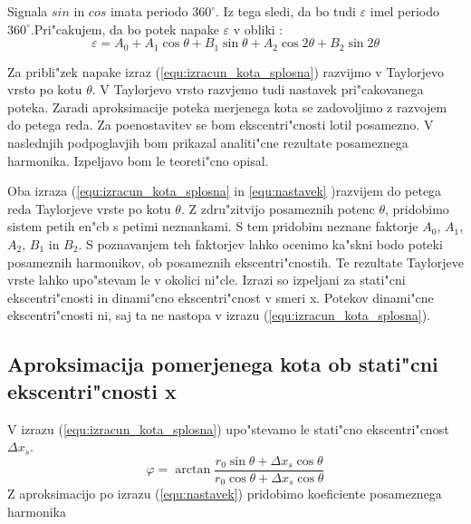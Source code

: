 Signala $sin$ in $cos$ imata periodo $360^\circ$. Iz tega sledi, da bo tudi $\varepsilon$ imel periodo $360^\circ $.Pri"cakujem, da bo potek napake $\varepsilon$ v obliki :
\begin{equation}
\label{equ:nastavek}
\varepsilon=A_0+A_1 \cos \theta +B_1 \sin \theta+A_2 \cos 2\theta +B_2 \sin 2\theta
\end{equation}

Za pribli"zek napake izraz  (\ref{equ:izracun_kota_splosna}) razvijmo v Taylorjevo vrsto po kotu $\theta$. V Taylorjevo vrsto razvjemo tudi nastavek pri"cakovanega poteka. Zaradi aproksimacije poteka merjenega kota se zadovoljimo z razvojem do petega reda. Za poenostavitev se bom ekscentri"cnosti lotil posamezno. V naslednjih podpoglavjih bom prikazal analiti"cne rezultate posameznega harmonika. Izpeljavo bom le teoreti"cno opisal.

Oba izraza (\ref{equ:izracun_kota_splosna} in \ref{equ:nastavek} )razvijem do petega reda Taylorjeve vrste  po kotu $\theta$. Z zdru"zitvijo posameznih potenc $\theta$, pridobimo sistem petih en"cb s petimi neznankami. S tem pridobim neznane faktorje $A_0$, $A_1$, $A_2$, $B_1$ in $B_2$. S poznavanjem teh faktorjev lahko ocenimo ka"skni bodo poteki posameznih harmonikov, ob posameznih ekscentri"cnostih. Te rezultate Taylorjeve vrste lahko upo"stevam le v okolici ni"cle. Izrazi so izpeljani za stati"cni ekscentri"cnosti in dinami"cno ekscentri"cnost v smeri x. Potekov dinami"cne ekscentri"cnosti ni, saj ta ne nastopa v izrazu (\ref{equ:izracun_kota_splosna}).
\subsection{Aproksimacija pomerjenega kota ob stati"cni ekscentri"cnosti x}
V izrazu (\ref{equ:izracun_kota_splosna}) upo"stevamo le stati"cno ekscentri"cnost $\Delta x_s$.
\begin{equation}
\label{equ:izracun_kota_xs}
\varphi=\arctan \frac{r_0 \sin\theta +\Delta x_s \cos\theta}{r_0 \cos\theta +\Delta x_s \cos\theta}
\end{equation}
Z aproksimacijo po izrazu (\ref{equ:nastavek}) pridobimo koeficiente posameznega harmonika

